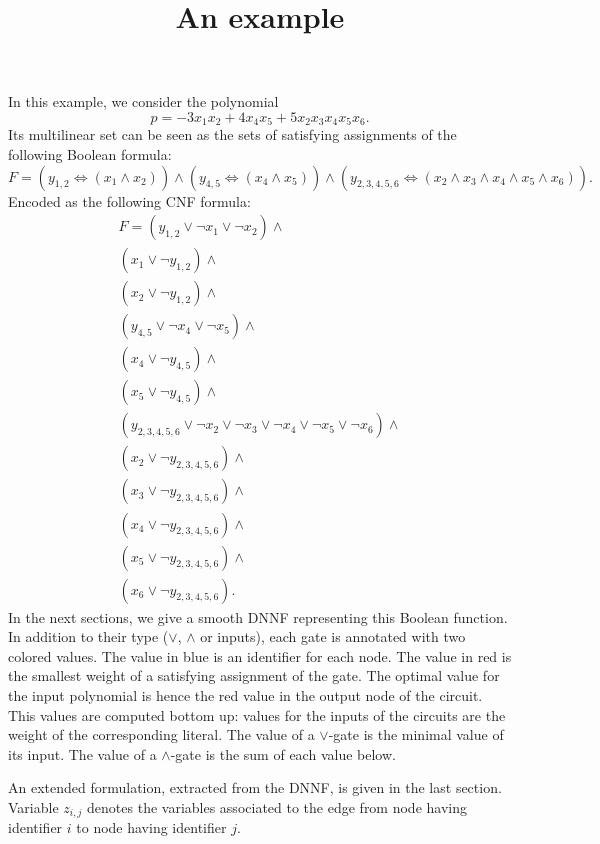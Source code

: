 \documentclass{article}
\title{An example}
\begin{document}
\maketitle

In this example, we consider the polynomial \[ p = -3x_1x_2+4x_4x_5+5x_2x_3x_4x_5x_6.\]
Its multilinear set can be seen as the sets of satisfying assignments of the following Boolean formula: \[ F = \left(y_{1,2} \Leftrightarrow (x_1\wedge x_2)\right)\wedge \left(y_{4,5} \Leftrightarrow (x_4\wedge x_5)\right)\wedge \left(y_{2,3,4,5,6} \Leftrightarrow (x_2\wedge x_3\wedge x_4\wedge x_5\wedge x_6)\right).\]
Encoded as the following CNF formula: \begin{align*} F = \left(y_{1,2} \vee \neg x_1\vee \neg x_2\right)\wedge \\(x_1 \vee  \neg y_{1,2})\wedge \\(x_2 \vee  \neg y_{1,2})\wedge \\\left(y_{4,5} \vee \neg x_4\vee \neg x_5\right)\wedge \\(x_4 \vee  \neg y_{4,5})\wedge \\(x_5 \vee  \neg y_{4,5})\wedge \\\left(y_{2,3,4,5,6} \vee \neg x_2\vee \neg x_3\vee \neg x_4\vee \neg x_5\vee \neg x_6\right)\wedge \\(x_2 \vee  \neg y_{2,3,4,5,6})\wedge \\(x_3 \vee  \neg y_{2,3,4,5,6})\wedge \\(x_4 \vee  \neg y_{2,3,4,5,6})\wedge \\(x_5 \vee  \neg y_{2,3,4,5,6})\wedge \\(x_6 \vee  \neg y_{2,3,4,5,6}).\end{align*}
In the next sections, we give a smooth DNNF representing this Boolean function. In addition to their type ($\vee$, $\wedge$ or inputs), each gate is annotated with two colored values. The value in blue is an identifier for each node. The value in red is the smallest weight of a satisfying assignment of the gate. The optimal value for the input polynomial is hence the red value in the output node of the circuit. This values are computed bottom up: values for the inputs of the circuits are the weight of the corresponding literal. The value of a $\vee$-gate is the minimal value of its input. The value of a $\wedge$-gate is the sum of each value below. 

An extended formulation, extracted from the DNNF, is given in the last section. Variable $z_{{i,j}}$ denotes the variables associated to the edge from node having identifier $i$ to node having identifier $j$.
\end{document}
